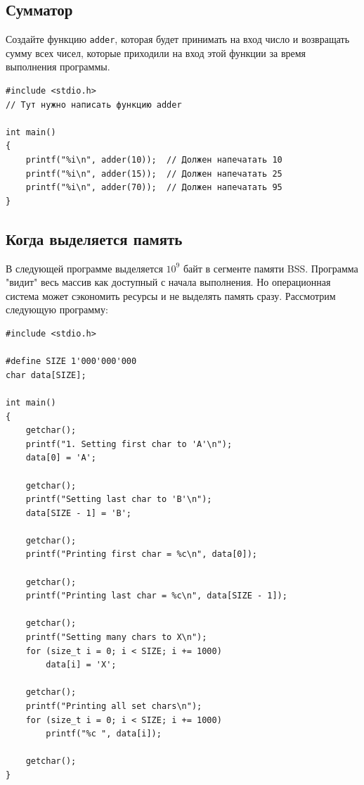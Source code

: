 \documentclass[10pt]{article}
\begin{document}
\subsection{Сумматор}
Создайте функцию \texttt{adder}, которая будет принимать на вход число и возвращать сумму всех чисел, которые приходили на вход этой функции за время выполнения программы.
\begin{lstlisting}
#include <stdio.h>
// Тут нужно написать функцию adder

int main()
{
    printf("%i\n", adder(10));  // Должен напечатать 10
    printf("%i\n", adder(15));  // Должен напечатать 25
    printf("%i\n", adder(70));  // Должен напечатать 95
}
\end{lstlisting}

\subsection{Когда выделяется память}
В следующей программе выделяется $10^9$ байт в сегменте памяти BSS. Программа "видит"{} весь массив как доступный с начала выполнения. Но операционная система может сэкономить ресурсы и не выделять память сразу. Рассмотрим следующую программу:
\begin{lstlisting}
#include <stdio.h>

#define SIZE 1'000'000'000
char data[SIZE];

int main()
{
    getchar();
    printf("1. Setting first char to 'A'\n");
    data[0] = 'A';
    
    getchar();
    printf("Setting last char to 'B'\n");
    data[SIZE - 1] = 'B';
    
    getchar();
    printf("Printing first char = %c\n", data[0]);
    
    getchar();
    printf("Printing last char = %c\n", data[SIZE - 1]);
    
    getchar();
    printf("Setting many chars to X\n");
    for (size_t i = 0; i < SIZE; i += 1000)
        data[i] = 'X';
        
    getchar();
    printf("Printing all set chars\n");
    for (size_t i = 0; i < SIZE; i += 1000)
        printf("%c ", data[i]);
        
    getchar();
}
\end{lstlisting}
\end{document}
